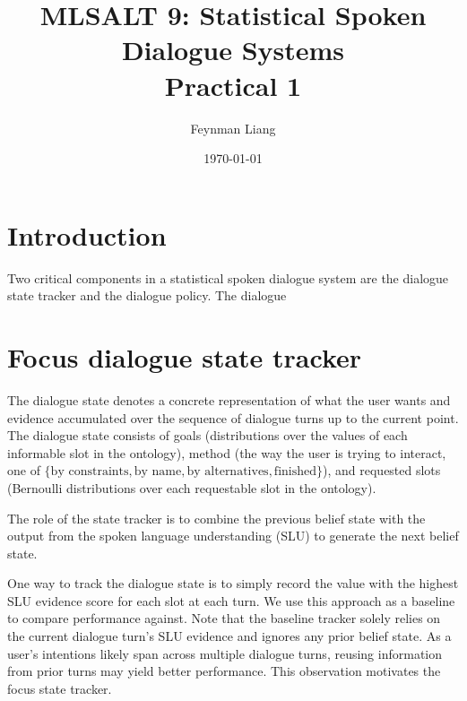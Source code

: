 \documentclass[a4paper,oneside,reqno]{amsart}
\newcommand{\authorname}{Feynman Liang}
\newcommand{\coursename}{MLSALT 9: Statistical Spoken Dialogue Systems}
\newcommand{\assignmentname}{Practical 1}
\begin{document}
%

\title{\coursename\\\assignmentname}

\author{\authorname}
\date{\today}

\maketitle

\section{Introduction}

Two critical components in a statistical spoken dialogue system
are the dialogue state tracker and the dialogue policy. The dialogue

\section{Focus dialogue state tracker}

The dialogue state denotes a concrete representation of what the user wants and
evidence accumulated over the sequence of dialogue turns up to the current
point. The dialogue state consists of goals (distributions over the values of
each informable slot in the ontology), method (the way the user is trying to
interact, one of $\{\text{by constraints}, \text{by name}, \text{by
alternatives}, \text{finished}\}$), and requested slots (Bernoulli
distributions over each requestable slot in the ontology).

The role of the state tracker is to combine the previous belief state
with the output from the spoken language understanding (SLU) to generate the
next belief state.

One way to track the dialogue state is to simply record the value with the
highest SLU evidence score for each slot at each turn. We use this approach
as a baseline to compare performance against. Note that the baseline tracker
solely relies on the current dialogue turn's SLU evidence and ignores any prior
belief state. As a user's intentions likely span across multiple dialogue
turns, reusing information from prior turns may yield better performance. This
observation motivates the focus state tracker.
\end{document}
